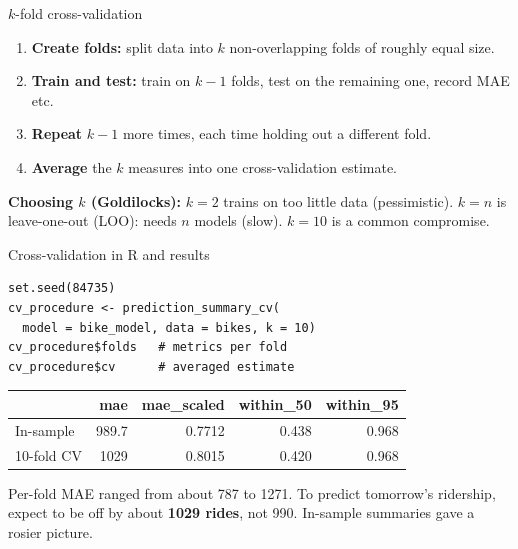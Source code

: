 \documentclass[aspectratio=43,11pt]{beamer}
\begin{document}
\begin{frame}{$k$-fold cross-validation}
  \begin{enumerate}
    \item \textbf{Create folds:} split data into $k$ non-overlapping folds of roughly equal size.
    \item \textbf{Train and test:} train on $k-1$ folds, test on the remaining one, record MAE etc.
    \item \textbf{Repeat} $k-1$ more times, each time holding out a different fold.
    \item \textbf{Average} the $k$ measures into one cross-validation estimate.
  \end{enumerate}
  \vspace{0.4em}
  \begin{center}
  \end{center}
  \textbf{Choosing $k$ (Goldilocks):} $k=2$ trains on too little data (pessimistic). $k=n$ is leave-one-out (LOO): needs $n$ models (slow). $k=10$ is a common compromise.
\end{frame}

\begin{frame}[fragile]{Cross-validation in R and results}
\begin{lstlisting}
set.seed(84735)
cv_procedure <- prediction_summary_cv(
  model = bike_model, data = bikes, k = 10)
cv_procedure$folds   # metrics per fold
cv_procedure$cv      # averaged estimate
\end{lstlisting}
  \begin{center}
  \begin{tabular}{lrrrr}
    \toprule
     & mae & mae\_scaled & within\_50 & within\_95\\
    \midrule
    In-sample & 989.7 & 0.7712 & 0.438 & 0.968\\
    10-fold CV & 1029 & 0.8015 & 0.420 & 0.968\\
    \bottomrule
  \end{tabular}
  \end{center}
  Per-fold MAE ranged from about 787 to 1271. To predict tomorrow's ridership, expect to be off by about \textbf{1029 rides}, not 990. In-sample summaries gave a rosier picture.
\end{frame}
\end{document}
